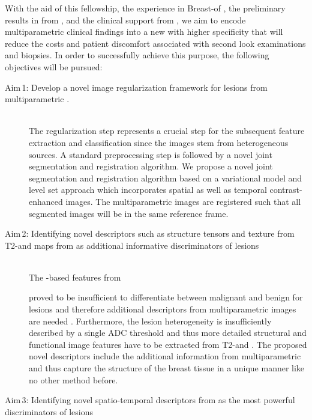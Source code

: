 With the aid of this fellowship, the experience in Breast-\cad of \vicorob, the preliminary results in \cemri from \florida, and the clinical support from \udiat, we aim to encode multiparametric \mri clinical findings into a new \cad with higher specificity that will reduce the costs and patient discomfort associated with second look examinations and biopsies.
In order to successfully achieve this purpose, the following objectives will be pursued:

\begin{description}
\item [Aim\,1: Develop a novel image regularization framework for \nmle lesions from multiparametric \mri.] \hfill \\
  The regularization step represents a crucial step for the subsequent feature
  extraction and classification since the images stem from heterogeneous
  sources. A standard preprocessing step is followed by a novel joint
  segmentation and registration algorithm. We propose a novel joint
  segmentation and registration algorithm based on a variational model and
  level set approach which incorporates spatial as well as temporal
  contrast-enhanced images.
  The multiparametric images are registered such that all segmented images will
  be in the same reference frame.

  \item [Aim\,2: Identifying novel descriptors such as structure tensors and texture from T2-\mri and \ivim maps from \dwi as additional informative discriminators of \nmle lesions] \hfill \\
    The \birads-based features from \cemri
    
    proved to be insufficient to differentiate between malignant and benign for
    \nmle lesions and therefore additional descriptors from multiparametric
    images are needed . Furthermore, the lesion heterogeneity is
    insufficiently described by a single ADC threshold
    and thus more detailed structural and functional image features have to be
    extracted from T2-\mri and \dwi. The proposed novel descriptors include the
    additional information from multiparametric \mri and thus capture the
    structure of the breast tissue in a unique manner like no other method
    before.

  \item [Aim\,3: Identifying novel spatio-temporal descriptors from \cemri as the most powerful discriminators of \nmle lesions]
  \hfill \\


\end{description}
